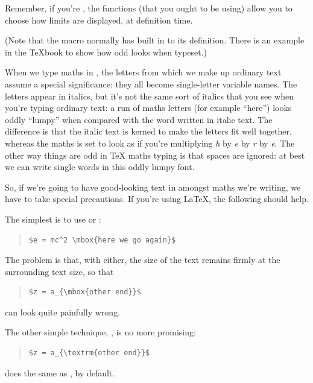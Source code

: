 Remember, if you're %
, the
\AMSLaTeX{} functions (that you ought to be using) allow you to choose
how limits are displayed, at definition time.

(Note that the macro  normally has  built in to
its definition.  There is an example in the \TeX{}book to show how odd
 looks when typeset.)


When we type maths in \AllTeX{}, the letters from which we make up
ordinary text assume a special significance: they all become
single-letter variable names.  The letters appear in italics, but it's
not the same sort of italics that you see when you're typing ordinary
text: a run of maths letters (for example ``here'') looks oddly
``lumpy'' when compared with the word written in italic text.  The
difference is that the italic text is kerned to make the letters fit
well together, whereas the maths is set to look as if you're
multiplying \emph{h} by \emph{e} by \emph{r} by \emph{e}.  The other
way things are odd in \TeX{} maths typing is that spaces are ignored:
at best we can write single words in this oddly lumpy font.

So, if we're going to have good-looking text in amongst maths we're
writing, we have to take special precautions.  If you're using
\LaTeX{}, the following should help.

The simplest is to use  or :
\begin{quote}
\begin{verbatim}
$e = mc^2 \mbox{here we go again}$
\end{verbatim}
\end{quote}
The problem is that, with either, the size of the text remains firmly
at the surrounding text size, so that
\begin{quote}
\begin{verbatim}
$z = a_{\mbox{other end}}$
\end{verbatim}
\end{quote}
can look quite painfully wrong.

The other simple technique, , is no more promising:
\begin{quote}
\begin{verbatim}
$z = a_{\textrm{other end}}$
\end{verbatim}
\end{quote}
does the same as , by default.

